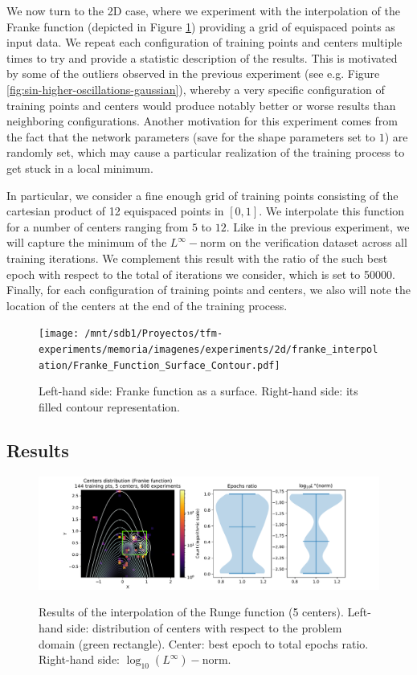 \documentclass[12pt]{report} %
\begin{document}
We now turn to the 2D case, where we experiment with the interpolation of the 
Franke function (depicted in Figure \ref{fig:franke-function-surface-contour})
providing a grid of equispaced points as input data. 
We repeat each configuration of training points and centers
multiple times to try and provide a statistic description of the results. 
This is motivated by some of the outliers observed in the previous experiment
(see e.g. Figure \ref{fig:sin-higher-oscillations-gaussian}), 
whereby a very specific configuration of training points and centers would 
produce notably better or worse results than neighboring configurations. 
Another motivation for this experiment comes from the fact that the network 
parameters (save for the shape parameters set to $1$) are randomly set, 
which may cause a particular realization of the training process to get stuck in a
local minimum.

In particular, we consider a fine enough grid of training points consisting of
the cartesian product of 12 equispaced points in $[0,1]$. We interpolate this
function for a number of centers ranging from $5$ to $12$. Like in the previous
experiment, we will capture the minimum of the $L^\infty-$norm on the 
verification dataset across all training iterations. We complement 
this result with the ratio of the such best epoch with respect to the 
total of iterations we consider, which is set to 50000. Finally, for each
configuration of training points and centers, we also will note the location 
of the centers at the end of the training process.

\begin{figure}[ht]
  \texttt{[image: /mnt/sdb1/Proyectos/tfm-experiments/memoria/imagenes/experiments/2d/franke\_interpolation/Franke\_Function\_Surface\_Contour.pdf]}
  \caption{Left-hand side: Franke function as a surface. Right-hand side:
  its filled contour representation.}
  \label{fig:franke-function-surface-contour}
\end{figure}


\subsection*{Results}

\begin{figure}[H]
  {\includegraphics[width=\textwidth, trim={2cm 0 2.8cm 0}, clip=true]{imagenes/experiments/2d/franke_interpolation/tr12_c5_franke.pdf}}
  \caption{Results of the interpolation of the Runge function (5 centers). 
  Left-hand side: distribution of centers with respect to the problem domain (green rectangle). Center: best epoch to total epochs ratio.
  Right-hand side: $\log_{10}(L^\infty)-$norm.}
  \label{fig:franke-tr12-c5}
\end{figure}
\end{document}
